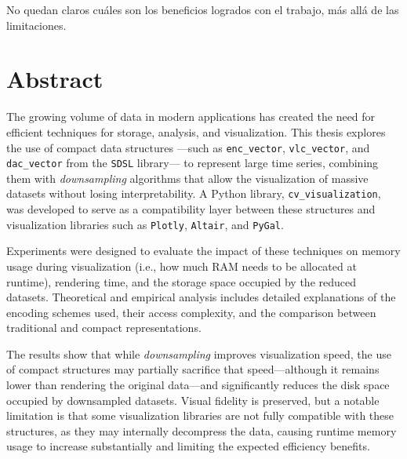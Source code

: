 \documentclass[12pt,twoside]{report}
\begin{document}
No quedan claros cuáles son los beneficios logrados con el trabajo, más allá de las limitaciones.

\chapter*{Abstract}
The growing volume of data in modern applications has created the need for efficient techniques for storage, analysis, and visualization. This thesis explores the use of compact data structures —such as \texttt{enc\_vector}, \texttt{vlc\_vector}, and \texttt{dac\_vector} from the \texttt{SDSL} library— to represent large time series, combining them with \textit{downsampling} algorithms that allow the visualization of massive datasets without losing interpretability. A Python library, \texttt{cv\_visualization}, was developed to serve as a compatibility layer between these structures and visualization libraries such as \texttt{Plotly}, \texttt{Altair}, and \texttt{PyGal}.

Experiments were designed to evaluate the impact of these techniques on memory usage during visualization (i.e., how much RAM needs to be allocated at runtime), rendering time, and the storage space occupied by the reduced datasets. Theoretical and empirical analysis includes detailed explanations of the encoding schemes used, their access complexity, and the comparison between traditional and compact representations.

The results show that while \textit{downsampling} improves visualization speed, the use of compact structures may partially sacrifice that speed—although it remains lower than rendering the original data—and significantly reduces the disk space occupied by downsampled datasets. Visual fidelity is preserved, but a notable limitation is that some visualization libraries are not fully compatible with these structures, as they may internally decompress the data, causing runtime memory usage to increase substantially and limiting the expected efficiency benefits.

\tableofcontents
\listoftables
\listoffigures

\clearpage
{}











\appendix
\renewcommand{\chaptertitlename}{Anexo}

\end{document}
